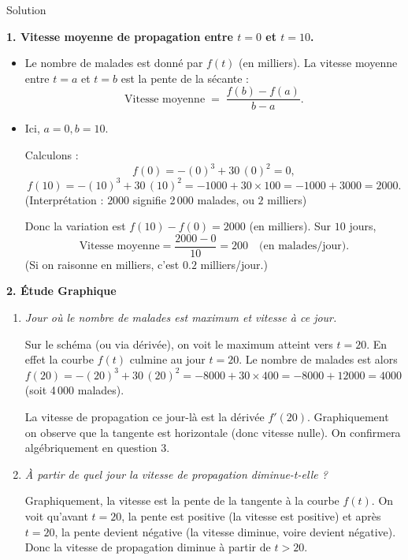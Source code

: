 \documentclass[a4paper,12pt]{article}
\begin{document}
\begin{solutionbox}{Solution}

\textbf{1. Vitesse moyenne de propagation entre $t=0$ et $t=10$.}

\begin{itemize}
  \item Le nombre de malades est donné par $f(t)$ (en milliers). La vitesse moyenne entre $t=a$ et $t=b$ est la pente de la sécante : 
  $$
    \text{Vitesse moyenne} \;=\; \frac{f(b) - f(a)}{b-a}.
  $$
  \item Ici, $a=0, b=10.$
  
  Calculons :
  \[
  f(0)= -(0)^3 + 30\,(0)^2 = 0,
  \]
  \[
  f(10)= -(10)^3 + 30\,(10)^2= -1000 +30\times100= -1000 +3000=2000.
  \]
  (Interprétation : $2000$ signifie 2\,000 malades, ou $2$ milliers)

  Donc la variation est $f(10)-f(0)=2000$ (en milliers). Sur $10$ jours,
  \[
    \text{Vitesse moyenne} = \frac{2000-0}{10} = 200 \quad\text{(en malades/jour)}.
  \]
  (Si on raisonne en milliers, c’est $0.2$ milliers/jour.)

\end{itemize}

\medskip

\textbf{2. Étude Graphique}

\begin{enumerate}
  \item[(a)] \textit{Jour où le nombre de malades est maximum et vitesse à ce jour.}

  Sur le schéma (ou via dérivée), on voit le maximum atteint vers $t=20$. En effet la courbe $f(t)$ culmine au jour $t=20$. Le nombre de malades est alors $f(20)= -(20)^3 +30\,(20)^2= -8000 +30\times400= -8000 +12000=4000$ (soit 4\,000 malades).

  La vitesse de propagation ce jour-là est la dérivée $f'(20)$. Graphiquement on observe que la tangente est horizontale (donc vitesse nulle). On confirmera algébriquement en question 3.

  \item[(b)] \textit{À partir de quel jour la vitesse de propagation diminue-t-elle ?}

  Graphiquement, la vitesse est la pente de la tangente à la courbe $f(t)$. On voit qu’avant $t=20$, la pente est positive (la vitesse est positive) et après $t=20$, la pente devient négative (la vitesse diminue, voire devient négative). Donc la vitesse de propagation diminue à partir de $t>20$.
\end{enumerate}


\end{solutionbox}
\end{document}

